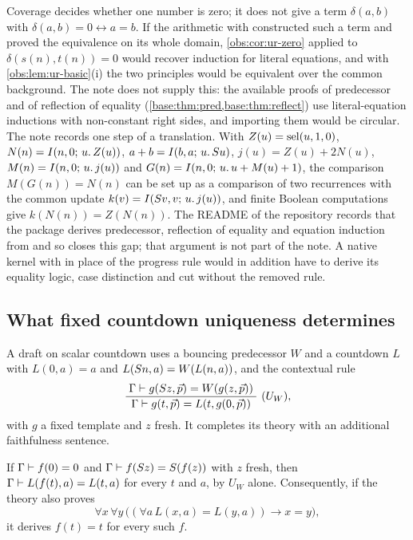 Coverage decides whether one number is zero; it does not give a term
$\delta(a,b)$ with $\delta(a,b)=0\leftrightarrow a=b$. If the arithmetic with
 constructed such a term and proved the equivalence on its whole
domain, \cref{obs:cor:ur-zero} applied to $\delta(s(n),t(n))=0$ would recover
induction for literal equations, and with \cref{obs:lem:ur-basic}(i) the two
principles would be equivalent over the common background. The note does not
supply this: the available proofs of predecessor and of reflection of equality
(\cref{base:thm:pred,base:thm:reflect}) use literal-equation inductions with
non-constant right sides, and importing them would be circular. The note
records one step of a translation. With $Z(u)=\operatorname{sel}(u,1,0)$,
$N(n)=I(n,0;\,u.\,Z(u))$, $a+b=I(b,a;\,u.\,S u)$, $j(u)=Z(u)+2N(u)$,
$M(n)=I(n,0;\,u.\,j(u))$ and $G(n)=I(n,0;\,u.\,u+M(u)+1)$, the comparison
$M(G(n))=N(n)$ can be set up as a comparison of two recurrences with the
common update $k(v)=I(S v,v;\,u.\,j(u))$, and finite Boolean computations
give $k(N(n))=Z(N(n))$. The README of the repository records that the package
 derives predecessor, reflection of equality and
equation induction from  and so closes this gap; that argument is
not part of the note. A native kernel with  in place of the
progress rule would in addition have to derive its equality logic, case
distinction and cut without the removed rule.

\subsection{What fixed countdown uniqueness determines}

A draft on scalar countdown uses a bouncing predecessor $W$ and a countdown
$L$ with $L(0,a)=a$ and $L(S n,a)=W(L(n,a))$, and the contextual rule
\[
\dfrac{\;\Gamma\vdash g(S z,\vec p)=W(g(z,\vec p))\;}{\;\Gamma\vdash g(t,\vec p)=L(t,g(0,\vec p))\;}\ (U_W),
\]
with $g$ a fixed template and $z$ fresh. It completes its theory with an
additional faithfulness sentence.

\begin{lemma}
\label{obs:lem:action}
If $\Gamma\vdash f(0)=0$ and $\Gamma\vdash f(S z)=S(f(z))$ with $z$
fresh, then $\Gamma\vdash L(f(t),a)=L(t,a)$ for every $t$ and $a$, by $U_W$
alone. Consequently, if the theory also proves
\[
\forall x\,\forall y\,\bigl((\forall a\,L(x,a)=L(y,a))\to x=y\bigr),
\]
it derives $f(t)=t$ for every such $f$.
\end{lemma}

